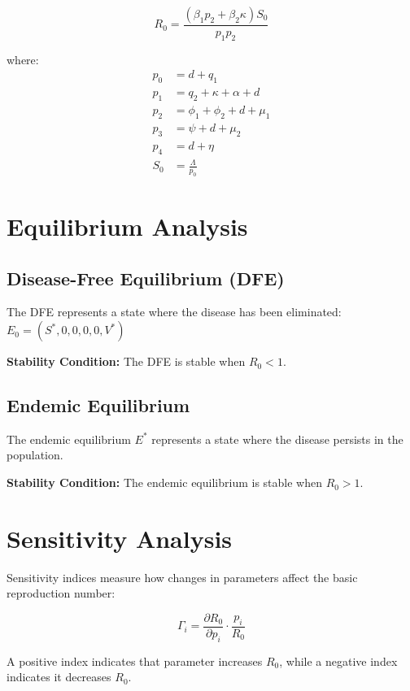 \documentclass[12pt,a4paper]{report}
\begin{document}
\begin{equation}
R_0 = \frac{(\beta_1 p_2 + \beta_2 \kappa)S_0}{p_1 p_2}
\end{equation}

where:
\begin{align*}
p_0 &= d + q_1 \\
p_1 &= q_2 + \kappa + \alpha + d \\
p_2 &= \phi_1 + \phi_2 + d + \mu_1 \\
p_3 &= \psi + d + \mu_2 \\
p_4 &= d + \eta \\
S_0 &= \frac{\Lambda}{p_0}
\end{align*}

\section{Equilibrium Analysis}

\subsection{Disease-Free Equilibrium (DFE)}

The DFE represents a state where the disease has been eliminated: $E_0 = (S^*, 0, 0, 0, 0, V^*)$

\textbf{Stability Condition:} The DFE is stable when $R_0 < 1$.

\subsection{Endemic Equilibrium}

The endemic equilibrium $E^*$ represents a state where the disease persists in the population.

\textbf{Stability Condition:} The endemic equilibrium is stable when $R_0 > 1$.

\section{Sensitivity Analysis}

Sensitivity indices measure how changes in parameters affect the basic reproduction number:

\begin{equation}
\Gamma_i = \frac{\partial R_0}{\partial p_i} \cdot \frac{p_i}{R_0}
\end{equation}

A positive index indicates that parameter increases $R_0$, while a negative index indicates it decreases $R_0$.
\end{document}
